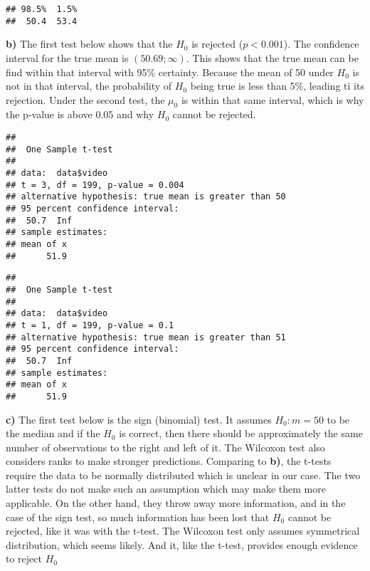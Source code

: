 \documentclass[
]{article}
\newenvironment{Shaded}{\begin{snugshade}}{\end{snugshade}}
\newcommand{\AttributeTok}[1]{\textcolor[rgb]{0.13,0.29,0.53}{#1}}
\newcommand{\DecValTok}[1]{\textcolor[rgb]{0.00,0.00,0.81}{#1}}
\newcommand{\FunctionTok}[1]{\textcolor[rgb]{0.13,0.29,0.53}{\textbf{#1}}}
\newcommand{\NormalTok}[1]{#1}
\newcommand{\SpecialCharTok}[1]{\textcolor[rgb]{0.81,0.36,0.00}{\textbf{#1}}}
\newcommand{\StringTok}[1]{\textcolor[rgb]{0.31,0.60,0.02}{#1}}
\begin{document}
\begin{verbatim}
## 98.5%  1.5% 
##  50.4  53.4
\end{verbatim}

\textbf{b)} The first test below shows that the \(H_0\) is rejected
(\(p<0.001\)). The confidence interval for the true mean is
\((50.69; \infty)\). This shows that the true mean can be find within
that interval with 95\% certainty. Because the mean of 50 under \(H_0\)
is not in that interval, the probability of \(H_0\) being true is less
than 5\%, leading ti its rejection. Under the second test, the \(\mu_0\)
is within that same interval, which is why the p-value is above 0.05 and
why \(H_0\) cannot be rejected.

\begin{Shaded}
\end{Shaded}

\begin{verbatim}
## 
##  One Sample t-test
## 
## data:  data$video
## t = 3, df = 199, p-value = 0.004
## alternative hypothesis: true mean is greater than 50
## 95 percent confidence interval:
##  50.7  Inf
## sample estimates:
## mean of x 
##      51.9
\end{verbatim}

\begin{Shaded}
\end{Shaded}

\begin{verbatim}
## 
##  One Sample t-test
## 
## data:  data$video
## t = 1, df = 199, p-value = 0.1
## alternative hypothesis: true mean is greater than 51
## 95 percent confidence interval:
##  50.7  Inf
## sample estimates:
## mean of x 
##      51.9
\end{verbatim}

\textbf{c)} The first test below is the sign (binomial) test. It assumes
\(H_0: m=50\) to be the median and if the \(H_0\) is correct, then there
should be approximately the same number of observations to the right and
left of it. The Wilcoxon test also considers ranks to make stronger
predictions. Comparing to \textbf{b)}, the t-tests require the data to
be normally distributed which is unclear in our case. The two latter
tests do not make such an assumption which may make them more
applicable. On the other hand, they throw away more information, and in
the case of the sign test, so much information has been lost that
\(H_0\) cannot be rejected, like it was with the t-test. The Wilcoxon
test only assumes symmetrical distribution, which seems likely. And it,
like the t-test, provides enough evidence to reject \(H_0\)
\end{document}
